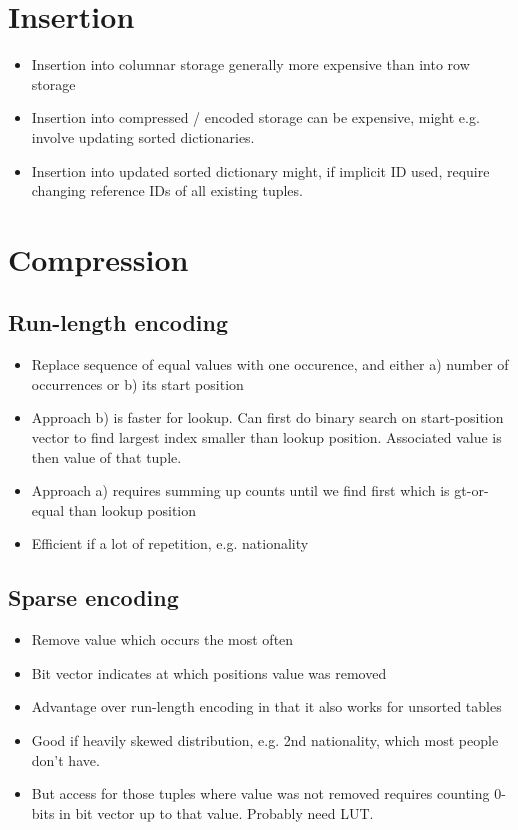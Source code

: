 \documentclass[a4paper]{scrreprt}
\begin{document}
\section{Insertion}

\begin{itemize}
		\item Insertion into columnar storage generally more expensive than into row storage
		\item Insertion into compressed / encoded storage can be expensive,
				might e.g. involve updating sorted dictionaries.
		\item Insertion into updated sorted dictionary might, if implicit ID
				used, require changing reference IDs of all existing tuples.
\end{itemize}

\section{Compression}

\subsection{Run-length encoding}

\begin{itemize}
		\item Replace sequence of equal values with one occurence, and either
				a) number of occurrences or b) its start position
		\item Approach b) is faster for lookup. Can first do binary search on
				start-position vector to find largest index smaller than lookup
				position. Associated value is then value of that tuple.
		\item Approach a) requires summing up counts until we find first which
				is gt-or-equal than lookup position
		\item Efficient if a lot of repetition, e.g. nationality
\end{itemize}

\subsection{Sparse encoding}

\begin{itemize}
		\item Remove value which occurs the most often
		\item Bit vector indicates at which positions value was removed
		\item Advantage over run-length encoding in that it also works for
				unsorted tables
		\item Good if heavily skewed distribution, e.g. 2nd nationality, which
				most people don't have.
		\item But access for those tuples where value was not removed requires
				counting 0-bits in bit vector up to that value. Probably need LUT.
\end{itemize}
\end{document}
